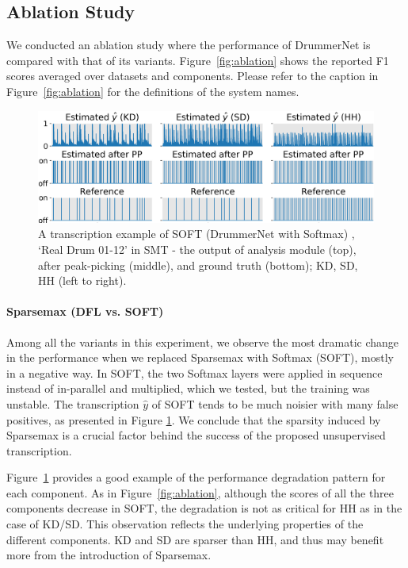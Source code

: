 \documentclass{article}
\newcommand{\largesqueeze}{\vspace{-0.2cm}}
\begin{document}
	\largesqueeze
	\subsection{Ablation Study}
	
	We conducted an ablation study where the performance of DrummerNet is compared with that of its variants. Figure~\ref{fig:ablation} shows the reported F1 scores averaged over datasets and components. Please refer to the caption in Figure~\ref{fig:ablation} for the definitions of the system names.
	
	\begin{figure}[t]
		\centering
		\includegraphics[width=\columnwidth]{false_positives_soft.png}
		\caption{A transcription example of SOFT (DrummerNet with Softmax) , `Real Drum 01-12' in SMT - the output of analysis module (top), after peak-picking (middle), and ground truth (bottom); KD, SD, HH (left to right).}
		\label{fig:soft_example}
	\end{figure}
	
	\largesqueeze
	\paragraph{Sparsemax (DFL vs. SOFT)}
	
	Among all the variants in this experiment, we observe the most dramatic change in the performance when we replaced Sparsemax with Softmax (SOFT), mostly in a negative way. In SOFT, the two Softmax layers were applied in sequence instead of in-parallel and multiplied, which we tested, but the training was unstable. The transcription $\hat{y}$ of SOFT tends to be much noisier with many false positives, as presented in Figure \ref{fig:soft_example}. We conclude that the sparsity induced by Sparsemax is a crucial factor behind the success of the proposed unsupervised transcription.
	
	Figure~\ref{fig:soft_example} provides a good example of the performance degradation pattern for each component. As in Figure~\ref{fig:ablation}, although the scores of all the three components decrease in SOFT, the degradation is not as critical for HH as in the case of KD/SD. This observation reflects the underlying properties of the different components. KD and SD are sparser than HH, and thus may benefit more from the introduction of Sparsemax. 
	
\end{document}
